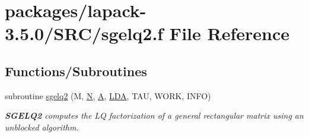 \hypertarget{sgelq2_8f}{}\section{packages/lapack-\/3.5.0/\+S\+R\+C/sgelq2.f File Reference}
\label{sgelq2_8f}
\subsection*{Functions/\+Subroutines}
\begin{DoxyCompactItemize}
\item 
subroutine \hyperlink{group__realGEcomputational_ga1e2c1e289965eabae7fb4a1bd78aed2c}{sgelq2} (M, \hyperlink{polmisc_8c_a0240ac851181b84ac374872dc5434ee4}{N}, \hyperlink{classA}{A}, \hyperlink{example__user_8c_ae946da542ce0db94dced19b2ecefd1aa}{L\+D\+A}, T\+A\+U, W\+O\+R\+K, I\+N\+F\+O)
\begin{DoxyCompactList}\small\item\em {\bfseries S\+G\+E\+L\+Q2} computes the L\+Q factorization of a general rectangular matrix using an unblocked algorithm. \end{DoxyCompactList}\end{DoxyCompactItemize}
